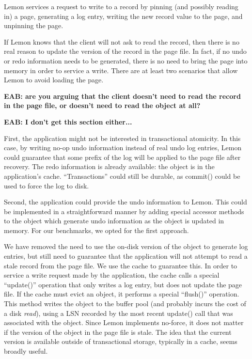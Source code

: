 \documentclass[letterpaper,twocolumn,english]{article}
\newcommand{\yad}{Lemon\xspace}
\newcommand{\eab}[1]{{\bf EAB: #1}}
\begin{document}
\yad services a request to write to a record by pinning (and possibly
reading in) a page, generating a log entry, writing the
new record value to the page, and unpinning the page.

If \yad knows that the client will not ask to read the record, then
there is no real reason to update the version of the record in the
page file.  In fact, if no undo or redo information needs to be
generated, there is no need to bring the page into memory in 
order to service a write.
There are at least two scenarios that allow \yad to avoid loading the page.

\eab{are you arguing that the client doesn't need to read the record in the page file, or doesn't need to read the object at all?}


\eab{I don't get this section either...}

First, the application might not be interested in transactional
atomicity.  In this case, by writing no-op undo information instead of
real undo log entries, \yad could guarantee that some prefix of the
log will be applied to the page file after recovery.  The redo
information is already available: the object is in the application's
cache.  ``Transactions'' could still be durable, as commit() could be
used to force the log to disk.  

Second, the application could provide the undo information to \yad.
This could be implemented in a straightforward manner by adding
special accessor methods to the object which generate undo information
as the object is updated in memory.  For our benchmarks, we opted for
the first approach.

We have removed the need to use the on-disk version of the object to
generate log entries, but still need to guarantee that the application
will not attempt to read a stale record from the page file.  We use
the cache to guarantee this.  In order to service a write
request made by the application, the cache calls a special
``update()'' operation that only writes a log entry, but does not 
update the page file.  If the
cache must evict an object, it performs a special ``flush()''
operation.  This method writes the object to the buffer pool (and
probably incurs the cost of a disk {\em read}), using a LSN recorded by the
most recent update() call that was associated with the object.  Since
\yad implements no-force, it does not matter if the
version of the object in the page file is stale. The idea that the
current version is available outside of transactional storage, 
typically in a cache, seems broadly useful.
\end{document}
